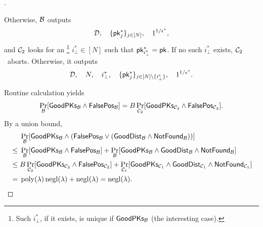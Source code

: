 \begin{proof}[]
\begin{itemize}
Otherwise, ${\mathcal{B}}$ outputs
\begin{align*}
\scriptD,\quad
\{\pk_j^\ast\}_{j\in[N]},\quad
1^{1/\epsilon^\ast},
\end{align*}
and ${\mathcal{C}}_2$ looks for an%
\footnote{Such $i_\bot^\ast$, if it exists, is unique if $\GoodPKs_\scriptB$
(the interesting case).}
${i_\bot^\ast\in[N]}$ such that ${\pk_{i_\bot^\ast}^\ast=\pk}$.
If no such $i_\bot^\ast$ exists, ${\mathcal{C}}_2$~aborts.
Otherwise, it outputs
\begin{align*}
\scriptD,\quad
N,\quad
i_\bot^\ast,\quad
\{\pk_j^\ast\}_{j\in{[N]\setminus{\{i_\bot^\ast\}}}},\quad
1^{1/\epsilon^\ast}.
\end{align*}
\end{itemize}
Routine calculation yields
\begin{align*}
\Pr_\scriptB[\GoodPKs_\scriptB\wedge\FalsePos_\scriptB]
=
B\Pr_{\scriptC_2}[\GoodPKs_{\scriptC_2}\wedge\FalsePos_{\scriptC_2}].
\end{align*}
By a union bound,
\begin{align*}
&
\Pr_\scriptB[\GoodPKs_\scriptB\wedge(\FalsePos_\scriptB\vee(\GoodDist_\scriptB\wedge\NotFound_\scriptB))]
\\\WideNarrow{}{\mathllap}{{}\leq{}}&
\Pr_\scriptB[\GoodPKs_\scriptB\wedge\FalsePos_\scriptB]
+
\Pr_\scriptB[\GoodPKs_\scriptB\wedge\GoodDist_\scriptB\wedge\NotFound_\scriptB]
\\\WideNarrow{}{\mathllap}{{}\leq{}}&
B\Pr_{\scriptC_2}[\GoodPKs_{\scriptC_2}\wedge\FalsePos_{\scriptC_2}]
+
\Pr_{\scriptC_1}
[\GoodPKs_{\scriptC_1}\wedge\GoodDist_{\scriptC_1}\wedge\NotFound_{\scriptC_1}]
\WideNarrow{}{\hspace*{-1em}}
\\\WideNarrow{}{\mathllap}{{}={}}&
\poly(\lambda)\negl(\lambda)+\negl(\lambda)
=
\negl(\lambda).
\qedhere
\end{align*}
\end{proof}
